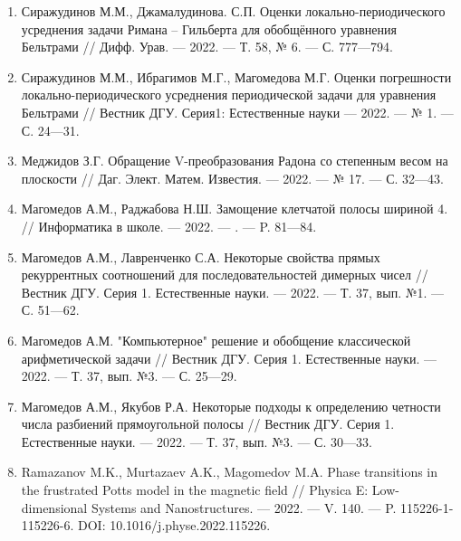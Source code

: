 \begin{enumerate}[1]

    \item
    Сиражудинов М.М., Джамалудинова. С.П.
    Оценки локально-периодического усреднения задачи Римана – Гильберта для обобщённого уравнения Бельтрами
    //
    Дифф. Урав.
    --- 2022.
    --- Т. 58, № 6.
    --- С. 777---794.

    \item
    Сиражудинов М.М., Ибрагимов М.Г., Магомедова М.Г.
    Оценки погрешности локально-периодического усреднения периодической задачи для уравнения Бельтрами
    //
    Вестник ДГУ. Серия1: Естественные науки
    --- 2022.
    --- № 1.
    --- С. 24---31.



    \item
    Меджидов З.Г.
    Обращение V-преобразования Радона со степенным весом на плоскости
    //
    Даг. Элект. Матем. Известия.
    --- 2022.
    --- № 17.
    --- С. 32---43.



    \item
    Магомедов А.М., Раджабова Н.Ш.
    Замощение клетчатой полосы шириной 4.
    //
    Информатика в школе.
    --- 2022.
    --- .
    --- P. 81---84.

    \item
    Магомедов А.М., Лавренченко С.А.
    Некоторые свойства прямых рекуррентных соотношений для последовательностей димерных чисел
    //
    Вестник ДГУ. Серия 1. Естественные науки.
    --- 2022.
    --- Т. 37, вып. №1.
    --- С. 51---62.

    \item
    Магомедов А.М.
    "Компьютерное" решение и обобщение классической арифметической задачи
    //
    Вестник ДГУ. Серия 1. Естественные науки.
    --- 2022.
    --- Т. 37, вып. №3.
    --- С. 25---29.

    \item
    Магомедов А.М., Якубов Р.А.
    Некоторые подходы к определению четности числа разбиений прямоугольной полосы
    //
    Вестник ДГУ. Серия 1. Естественные науки.
    --- 2022.
    --- Т. 37, вып. №3.
    --- С. 30---33.
    


    \item
    Ramazanov M.K., Murtazaev A.K., Magomedov M.A.
    Phase transitions in the frustrated Potts model in the magnetic field
    //
    Physica E: Low-dimensional Systems and Nanostructures.
    --- 2022.
    --- V. 140.
    --- P. 115226-1-115226-6. DOI: 10.1016/j.physe.2022.115226.


\end{enumerate}
